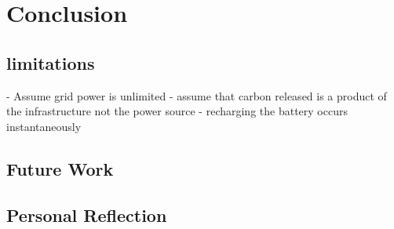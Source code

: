\documentclass{l4proj}
\begin{document}
\chapter{Conclusion}

\section{limitations}
- Assume grid power is unlimited
- assume that carbon released is a product of the infrastructure not the power source
- recharging the battery occurs instantaneously

\section{Future Work}\label{conc:sec:Future Work}
\section{Personal Reflection}\label{conc:sec:Personal Reflection}
\end{document}
